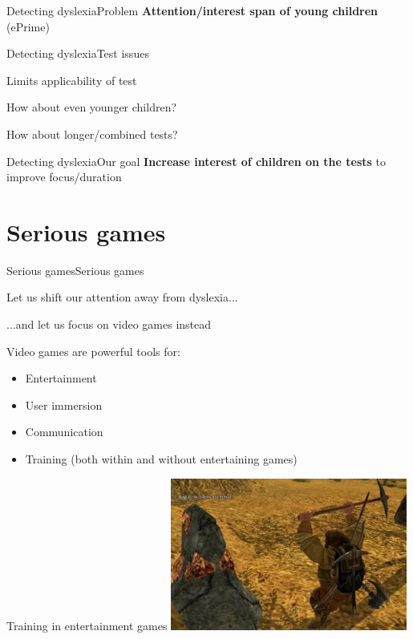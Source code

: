 \documentclass{beamer}
\begin{document}
\begin{textslide}{Detecting dyslexia}{Problem}{
\textbf{Attention/interest span of young children} (ePrime)
}\end{textslide}

\begin{slide}{Detecting dyslexia}{Test issues}{
\item Limits applicability of test
\item How about even younger children?
\item How about longer/combined tests?
}\end{slide}

\begin{textslide}{Detecting dyslexia}{Our goal}{
\textbf{Increase interest of children on the tests} to improve focus/duration 
}\end{textslide}


\section{Serious games}
\begin{slide}{Serious games}{Serious games}{
\item Let us shift our attention away from dyslexia...
\item ...and let us focus on video games instead
\pause
\item Video games are powerful tools for:
\begin{itemize}
\item Entertainment
\item User immersion
\item Communication
\item Training (both within and without entertaining games)
\end{itemize}
}\end{slide}

\begin{frame}{Training in entertainment games}
\center
\includegraphics[height=5cm]{Pics/grinding.png}
\end{frame}
\end{document}
